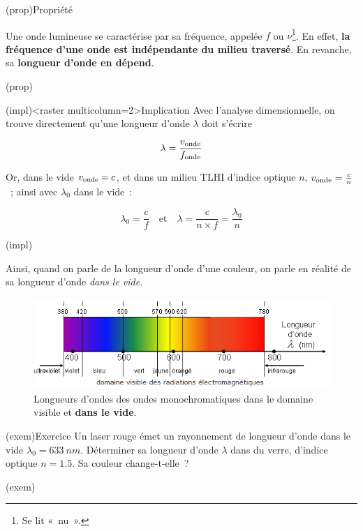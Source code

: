 \documentclass[../../main/main.tex]{subfiles}
\begin{document}
\begin{tcbraster}[raster columns=3, raster equal height=rows]
	\begin{tcb}(prop){Propriété}

		Une onde lumineuse se caractérise par sa fréquence, appelée $f$ ou
		$\nu$\footnote{Se lit «~nu~».}. En effet, \textbf{la fréquence d'une
			onde est indépendante du milieu traversé}. En revanche, sa
		\textbf{longueur d'onde en dépend}.

	\end{tcb}(prop)
	\begin{tcb}(impl)<raster multicolumn=2>{Implication}
		Avec l'analyse dimensionnelle, on trouve directement qu'une longueur
		d'onde $\lambda$ doit s'écrire

		\[\lambda = \frac{v_{\rm onde}}{f_{\rm onde}}\]

		Or, dans le vide $v_{\rm onde} = c$, et dans un milieu TLHI d'indice
		optique $n$, $v_{\rm onde} = \frac{c}{n}$~; ainsi avec $\lambda_0$ dans
		le vide~:

		\begin{equation*}
			\boxed{\lambda_0 = \frac{c}{f}}
			\quad\text{et}\quad
			\boxed{\lambda = \frac{c}{n\times f} = \frac{\lambda_0}{n}}
		\end{equation*}
	\end{tcb}(impl)
\end{tcbraster}

Ainsi, quand on parle de la longueur d'onde d'une couleur, on parle en réalité
de sa longueur d'onde \textit{dans le vide}.

\begin{figure}[h]
	\centering
	\includegraphics[width=\linewidth]{./figures/ch1_fig1.png}
	\caption{Longueurs d'ondes des ondes monochromatiques dans le domaine
		visible et \textbf{dans le vide}.}
	\label{fig:lambda_vis}
\end{figure}

\begin{tcb}(exem){Exercice}
	Un laser rouge émet un rayonnement de longueur d'onde dans le vide
	$\lambda_0 = \SI{633}{nm}$. Déterminer sa longueur d'onde $\lambda$ dans du
	verre, d'indice optique $n = \num{1.5}$. Sa couleur change-t-elle~?
	\tcblower
	\vspace{2cm}
\end{tcb}(exem)
\end{document}
